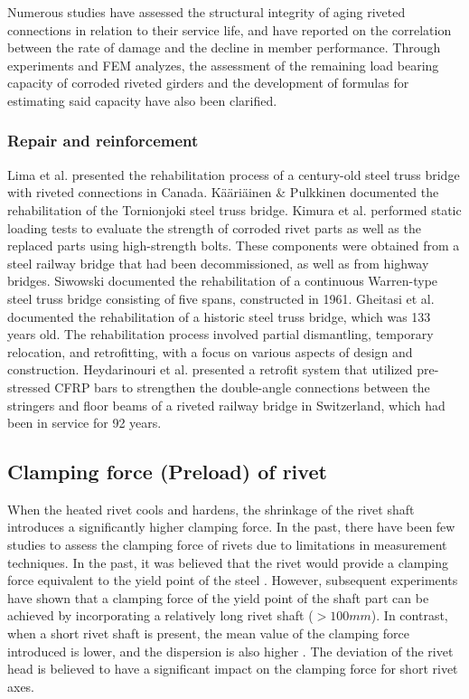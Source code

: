 Numerous studies\cite{imam2008,Ryoichi2013,1987163,hisanori1991} have assessed the structural integrity of aging riveted connections in relation to their service life, and have reported on the correlation between the rate of damage and the decline in member performance. Through experiments and FEM analyzes\cite{nakata2016, Yurika2019,chen2022jp,cheniabse2022,Pipinato2014ResidualApproach,Bertolesi2021FatigueApproach}, the assessment of the remaining load bearing capacity of corroded riveted girders and the development of formulas for estimating said capacity have also been clarified. 

\subsubsection{Repair and reinforcement}
Lima et al.\cite{lima2008} presented the rehabilitation process of a century-old steel truss bridge with riveted connections in Canada. Kääriäinen \& Pulkkinen \cite{kaaria2002} documented the rehabilitation of the Tornionjoki steel truss bridge. Kimura et al.\cite{kimura2009} performed static loading tests to evaluate the strength of corroded rivet parts as well as the replaced parts using high-strength bolts. These components were obtained from a steel railway bridge that had been decommissioned, as well as from highway bridges. Siwowski \cite{siwowski2013} documented the rehabilitation of a continuous Warren-type steel truss bridge consisting of five spans, constructed in 1961. Gheitasi et al. \cite{Gheitasi2022} documented the rehabilitation of a historic steel truss bridge, which was 133 years old. The rehabilitation process involved partial dismantling, temporary relocation, and retrofitting, with a focus on various aspects of design and construction. Heydarinouri et al. \cite{Heydarinouri2021} presented a retrofit system that utilized pre-stressed CFRP bars to strengthen the double-angle connections between the stringers and floor beams of a riveted railway bridge in Switzerland, which had been in service for 92 years.



\subsection{Clamping force (Preload) of rivet}

When the heated rivet cools and hardens, the shrinkage of the rivet shaft introduces a significantly higher clamping force. In the past, there have been few studies to assess the clamping force of rivets due to limitations in measurement techniques. In the past, it was believed that the rivet would provide a clamping force equivalent to the yield point of the steel \cite{VanMaarschalkerwaart1982FatigueJoints}. However, subsequent experiments have shown that a clamping force of the yield point of the shaft part can be achieved by incorporating a relatively long rivet shaft ($>100 mm$). In contrast, when a short rivet shaft is present, the mean value of the clamping force introduced is lower, and the dispersion is also higher \cite{Zhou1994FatigueMembers, Baron1953TheJoints}. The deviation of the rivet head is believed to have a significant impact on the clamping force for short rivet axes.

